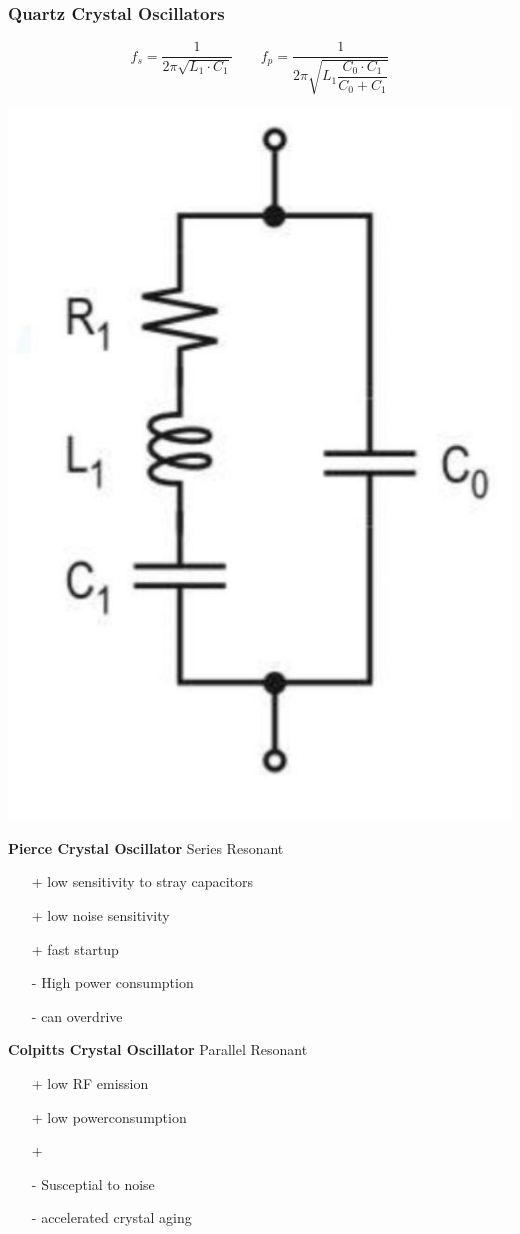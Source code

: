\subsubsection{Quartz Crystal Oscillators}
\vspace{-1cm}
\begin{minipage}{0.5\linewidth}
    \[ f_s=\dfrac{1}{2\pi \sqrt{L_1 \cdot C_1}}\qquad f_p=\dfrac{1}{2\pi \sqrt{L_1 \dfrac{C_0 \cdot C_1}{C_0 + C_1}}} \]
\end{minipage}
\begin{minipage}{0.5\linewidth}
    \hspace{2cm}\includegraphics[angle=90 ,width=0.4\linewidth]{images/QuartzESB} 
\end{minipage}
\begin{multicols}{2}
    \begin{minipage}{\linewidth}
        \textbf{Pierce Crystal Oscillator}\newline
        Series Resonant
        \begin{itemize}
            \item [+] low sensitivity to stray capacitors
            \item [+] low noise sensitivity
            \item [+] fast startup
            \item [-] High power consumption
            \item [-] can overdrive
        \end{itemize}
    \end{minipage}
    
    \begin{minipage}{\linewidth}
        \textbf{Colpitts Crystal Oscillator}\newline
       Parallel Resonant
        \begin{itemize}
            \item [+] low \acs{RF} emission
            \item [+] low powerconsumption
            \item [+] 
            \item [-] Susceptial to noise
            \item [-] accelerated crystal aging
        \end{itemize}
    \end{minipage}
\end{multicols}

